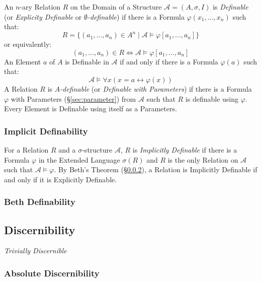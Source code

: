 An $n$-ary Relation $R$ on the Domain of a Structure $\mathcal{A} =
(A, \sigma, I)$ is \emph{Definable} (or \emph{Explicity Definable} or
\emph{$\emptyset$-definable}) if there is a Formula $\varphi
(x_1,\ldots,x_n)$ such that:
\[
  R = \{(a_1,\ldots,a_n) \in A^n \;|\; \mathcal{A} \models \varphi
    [a_1, \ldots, a_n]\}
\]
or equivalently:
\[
  (a_1, \ldots, a_n) \in R \Leftrightarrow \mathcal{A} \models
    \varphi[a_1, \ldots, a_n]
\]
An Element $a$ of $A$ is Definable in $\mathcal{A}$ if and only if
there is a Formula $\varphi(a)$ such that:
\[
  \mathcal{A} \models \forall x (x = a \leftrightarrow \varphi(x))
\]
A Relation $R$ is \emph{$A$-definable} (or \emph{Definable with
  Parameters}) if there is a Formula $\varphi$ with Parameters
(\S\ref{sec:parameter}) from $\mathcal{A}$ such that $R$ is definable
using $\varphi$. Every Element is Definable using itself as a
Parameters.



\subsubsection{Implicit Definability}\label{sec:implicit_definability}

For a Relation $R$ and a $\sigma$-structure $\mathcal{A}$, $R$ is
\emph{Implicitly Definable} if there is a Formula $\varphi$ in the
Extended Language $\sigma(R)$ and $R$ is the only Relation on
$\mathcal{A}$ such that $\mathcal{A} \models \varphi$. By Beth's
Theorem (\S\ref{sec:beth_definability}), a Relation is Implicitly
Definable if and only if it is Explicitly Definable.



\subsubsection{Beth Definability}\label{sec:beth_definability}



\subsection{Discernibility}\label{sec:discernibility}
\cite{ladyman-linnebo-pettigrew11}

\emph{Trivially Discernible}



\subsubsection{Absolute Discernibility}\label{sec:absolute_discernibility}

